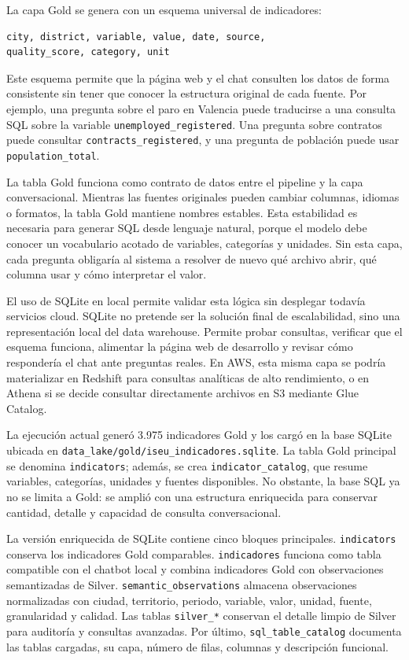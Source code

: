 La capa Gold se genera con un esquema universal de indicadores:

\begin{verbatim}
city, district, variable, value, date, source,
quality_score, category, unit
\end{verbatim}

Este esquema permite que la página web y el chat consulten los datos de forma consistente sin tener que conocer la estructura original de cada fuente. Por ejemplo, una pregunta sobre el paro en Valencia puede traducirse a una consulta SQL sobre la variable \texttt{unemployed\_registered}. Una pregunta sobre contratos puede consultar \texttt{contracts\_registered}, y una pregunta de población puede usar \texttt{population\_total}.

La tabla Gold funciona como contrato de datos entre el pipeline y la capa conversacional. Mientras las fuentes originales pueden cambiar columnas, idiomas o formatos, la tabla Gold mantiene nombres estables. Esta estabilidad es necesaria para generar SQL desde lenguaje natural, porque el modelo debe conocer un vocabulario acotado de variables, categorías y unidades. Sin esta capa, cada pregunta obligaría al sistema a resolver de nuevo qué archivo abrir, qué columna usar y cómo interpretar el valor.

El uso de SQLite en local permite validar esta lógica sin desplegar todavía servicios cloud. SQLite no pretende ser la solución final de escalabilidad, sino una representación local del data warehouse. Permite probar consultas, verificar que el esquema funciona, alimentar la página web de desarrollo y revisar cómo respondería el chat ante preguntas reales. En AWS, esta misma capa se podría materializar en Redshift para consultas analíticas de alto rendimiento, o en Athena si se decide consultar directamente archivos en S3 mediante Glue Catalog.

La ejecución actual generó 3.975 indicadores Gold y los cargó en la base SQLite ubicada en \texttt{data\_lake/gold/}\newline\texttt{iseu\_indicadores.sqlite}. La tabla Gold principal se denomina \texttt{indicators}; además, se crea \texttt{indicator\_catalog}, que resume variables, categorías, unidades y fuentes disponibles. No obstante, la base SQL ya no se limita a Gold: se amplió con una estructura enriquecida para conservar cantidad, detalle y capacidad de consulta conversacional.

La versión enriquecida de SQLite contiene cinco bloques principales. \texttt{indicators} conserva los indicadores Gold comparables. \texttt{indicadores} funciona como tabla compatible con el chatbot local y combina indicadores Gold con observaciones semantizadas de Silver. \texttt{semantic\_observations} almacena observaciones normalizadas con ciudad, territorio, periodo, variable, valor, unidad, fuente, granularidad y calidad. Las tablas \texttt{silver\_*} conservan el detalle limpio de Silver para auditoría y consultas avanzadas. Por último, \texttt{sql\_table\_catalog} documenta las tablas cargadas, su capa, número de filas, columnas y descripción funcional.

